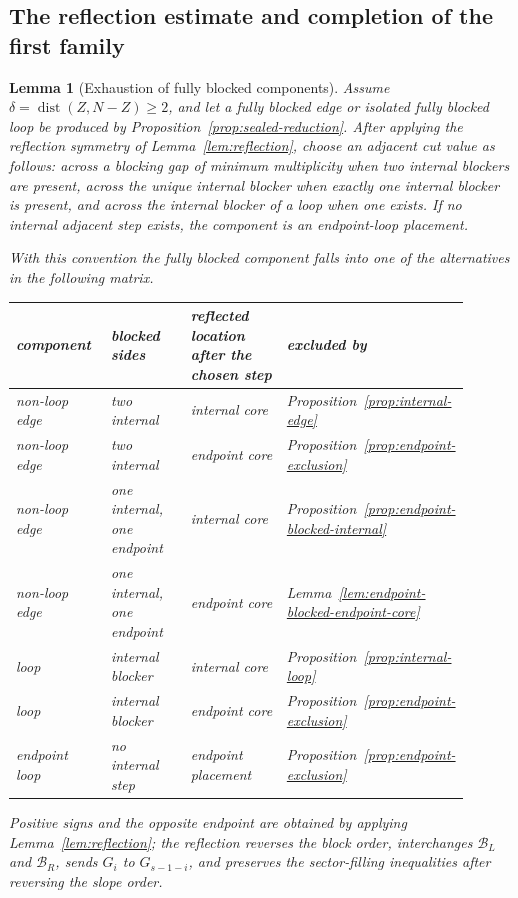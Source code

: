 \documentclass[11pt]{article}
\newtheorem{lemma}[theorem]{Lemma}
\newcommand{\dist}{\operatorname{dist}}
\begin{document}
\subsection{The reflection estimate and completion of the first family}

\begin{lemma}[Exhaustion of fully blocked components]\label{lem:sealed-exhaustion}
Assume \(\delta=\dist(Z,N-Z)\ge2\), and let a fully blocked edge or isolated fully blocked loop be produced by Proposition~\ref{prop:sealed-reduction}.  After applying the reflection symmetry of Lemma~\ref{lem:reflection}, choose an adjacent cut value as follows: across a blocking gap of minimum multiplicity when two internal blockers are present, across the unique internal blocker when exactly one internal blocker is present, and across the internal blocker of a loop when one exists.  If no internal adjacent step exists, the component is an endpoint-loop placement.

With this convention the fully blocked component falls into one of the alternatives in the following matrix.
\begin{center}
\small
\begin{tabular}{@{}>{\raggedright\arraybackslash}p{0.22\linewidth}>{\raggedright\arraybackslash}p{0.20\linewidth}>{\raggedright\arraybackslash}p{0.25\linewidth}>{\raggedright\arraybackslash}p{0.23\linewidth}@{}}
\textbf{component} & \textbf{blocked sides} & \textbf{reflected location after the chosen step} & \textbf{excluded by}\\ \hline
non-loop edge & two internal & internal core & Proposition~\ref{prop:internal-edge}\\
non-loop edge & two internal & endpoint core & Proposition~\ref{prop:endpoint-exclusion}\\
non-loop edge & one internal, one endpoint & internal core & Proposition~\ref{prop:endpoint-blocked-internal}\\
non-loop edge & one internal, one endpoint & endpoint core & Lemma~\ref{lem:endpoint-blocked-endpoint-core}\\
loop & internal blocker & internal core & Proposition~\ref{prop:internal-loop}\\
loop & internal blocker & endpoint core & Proposition~\ref{prop:endpoint-exclusion}\\
endpoint loop & no internal step & endpoint placement & Proposition~\ref{prop:endpoint-exclusion}
\end{tabular}
\end{center}
Positive signs and the opposite endpoint are obtained by applying Lemma~\ref{lem:reflection}; the reflection reverses the block order, interchanges \(\mathcal B_L\) and \(\mathcal B_R\), sends \(G_i\) to \(G_{s-1-i}\), and preserves the sector-filling inequalities after reversing the slope order.
\end{lemma}
\end{document}
